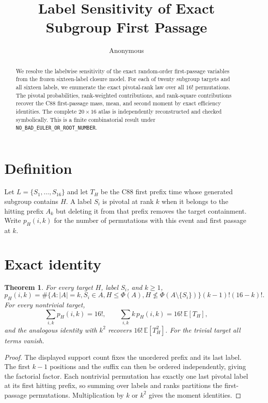 \documentclass[10pt]{article}
\title{Label Sensitivity of Exact Subgroup First Passage}
\author{Anonymous}
\date{}
\newtheorem{theorem}{Theorem}
\begin{document}
\maketitle
\begin{abstract}
We resolve the labelwise sensitivity of the exact random-order first-passage
variables from the frozen sixteen-label closure model.  For each of twenty
subgroup targets and all sixteen labels, we enumerate the exact pivotal-rank
law over all $16!$ permutations.  The pivotal probabilities, rank-weighted
contributions, and rank-square contributions recover the C88 first-passage
mass, mean, and second moment by exact efficiency identities.  The complete
$20\times16$ atlas is independently reconstructed and checked symbolically.
This is a finite combinatorial result under
\texttt{NO\_BAD\_EULER\_OR\_ROOT\_NUMBER}.
\end{abstract}

\section{Definition}
Let $L=\{S_1,\ldots,S_{16}\}$ and let $T_H$ be the C88 first prefix time
whose generated subgroup contains $H$.  A label $S_i$ is pivotal at rank $k$
when it belongs to the hitting prefix $A_k$ but deleting it from that prefix
removes the target containment.  Write $p_H(i,k)$ for the number of
permutations with this event and first passage at $k$.

\section{Exact identity}
\begin{theorem}
For every target $H$, label $S_i$, and $k\geq1$,
\[
p_H(i,k)=\#\{A:|A|=k,S_i\in A,H\leq\Phi(A),
H\not\leq\Phi(A\setminus\{S_i\})\}(k-1)!(16-k)!.
\]
For every nontrivial target,
\[
\sum_{i,k}p_H(i,k)=16!,\qquad
\sum_{i,k}k\,p_H(i,k)=16!\,\mathbb E[T_H],
\]
and the analogous identity with $k^2$ recovers
$16!\,\mathbb E[T_H^2]$.  For the trivial target all terms vanish.
\end{theorem}
\begin{proof}
The displayed support count fixes the unordered prefix and its last label.
The first $k-1$ positions and the suffix can then be ordered independently,
giving the factorial factor.  Each nontrivial permutation has exactly one
last pivotal label at its first hitting prefix, so summing over labels and
ranks partitions the first-passage permutations.  Multiplication by $k$ or
$k^2$ gives the moment identities.
\end{proof}
\end{document}
